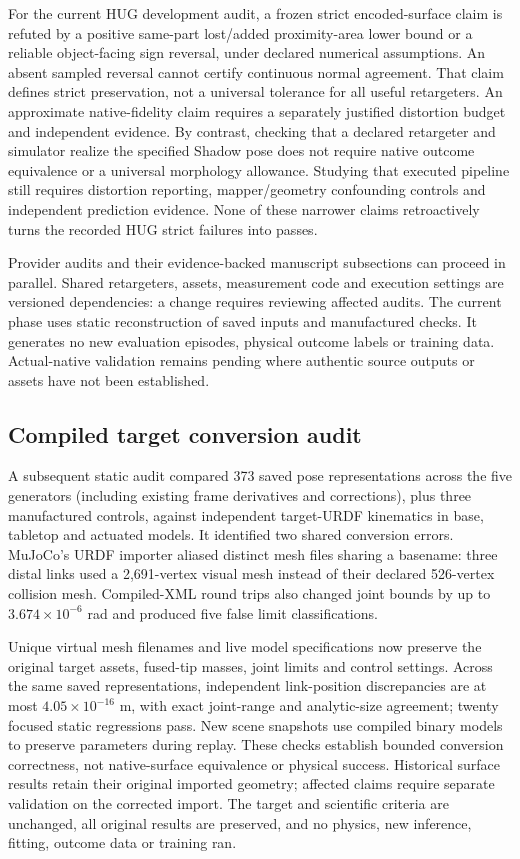 \documentclass[10pt,letterpaper]{article}
\begin{document}
For the current HUG development audit, a frozen strict encoded-surface claim
is refuted by a positive same-part lost/added proximity-area lower bound or a
reliable object-facing sign reversal, under declared numerical assumptions.
An absent sampled reversal cannot certify continuous normal agreement. That
claim defines strict preservation, not a universal tolerance for all useful
retargeters. An approximate native-fidelity claim requires a separately
justified distortion budget and independent evidence. By contrast, checking
that a declared retargeter and simulator realize the specified Shadow pose
does not require native outcome equivalence or a universal morphology
allowance. Studying that executed pipeline still requires distortion reporting,
mapper/geometry confounding controls and independent prediction evidence.
None of these narrower claims retroactively turns the recorded HUG strict
failures into passes.

Provider audits and their evidence-backed manuscript subsections can proceed
in parallel. Shared retargeters, assets, measurement code and execution settings
are versioned dependencies: a change requires reviewing affected audits.
The current phase uses static reconstruction of saved inputs and manufactured
checks. It generates no new evaluation episodes, physical outcome labels or
training data. Actual-native validation remains pending where authentic source
outputs or assets have not been established.

\subsection{Compiled target conversion audit}
A subsequent static audit compared 373 saved pose representations across the
five generators (including existing frame derivatives and corrections), plus
three manufactured controls, against independent target-URDF kinematics in
base, tabletop and actuated models. It identified two shared conversion errors.
MuJoCo's URDF importer aliased distinct mesh files sharing a basename: three
distal links used a 2,691-vertex visual mesh instead of their declared
526-vertex collision mesh. Compiled-XML round trips also changed joint bounds
by up to $3.674\times10^{-6}$ rad and produced five false limit classifications.

Unique virtual mesh filenames and live model specifications now preserve the
original target assets, fused-tip masses, joint limits and control settings.
Across the same saved representations, independent link-position discrepancies
are at most $4.05\times10^{-16}$ m, with exact joint-range and analytic-size
agreement; twenty focused static regressions pass. New scene snapshots use
compiled binary models to preserve parameters during replay. These checks
establish bounded conversion correctness, not native-surface equivalence or
physical success. Historical surface results retain their original imported
geometry; affected claims require separate validation on the corrected import.
The target and scientific criteria are unchanged, all original results are
preserved, and no physics, new inference, fitting, outcome data or training ran.
\end{document}
